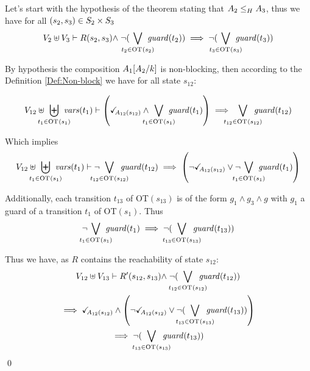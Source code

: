 \documentclass[runningheads]{llncs}
\begin{document}
\begin{enumerate}
Let's start  with the hypothesis of the theorem stating that $\wrel{A_2}{A_3}{H}$, thus we have for all  $\mpar{s_2, s_3} \in S_2 \times S_3$ 
\begin{multline*}
V_2 \uplus V_3  \vdash R\mpar{s_2, s_3} \nwedge \neg (\bigvee_\subbox{t_2 \in \fOT{s_2}} \fguard{t_2}) \implies   \neg(\bigvee_\subbox{t_3 \in \fOT{s_3}} \fguard{t_3})
\end{multline*}

By hypothesis  the composition  \(A_1\subst{A_2}{k}\) is non-blocking,  then according to the Definition \ref{Def:Non-block} we have for all state $s_{12}$: 


\begin{multline*}
V_{12} \uplus \biguplus_\subbox{t_1 \in \fOT{s_1}} \fvars{t_1}  \vdash  \left(\reach{A_{12}(s_{12})} \land \bigvee_\subbox{t_1 \in \fOT{s_1}} \fguard{t_1}\right) \implies \bigvee_\subbox{t_{12} \in \fOT{s_{12}}} \fguard{t_{12}}
\end{multline*}

Which implies 
\begin{multline*}
V_{12} \uplus \biguplus_\subbox{t_1 \in \fOT{s_1}} \fvars{t_1}  \vdash 
\neg{ \bigvee_\subbox{t_{12} \in \fOT{s_{12}}} \fguard{t_{12}}}
\implies 
\left(\neg{\reach{A_{12}(s_{12})} }\lor \neg{\bigvee_\subbox{t_1 \in \fOT{s_1}} \fguard{t_1}}
\right)
\end{multline*}

Additionally, each transition $t_{13}$ of OT$(s_{13})$ is of the form $
g_1\land g_3 \land g$ with $g_1$ a guard of a transition $t_{1}$ of OT$(s_{1})$.
Thus 
\[
\neg{\bigvee_\subbox{t_1 \in \fOT{s_1}} \fguard{t_1}}  \implies \neg (\bigvee_\subbox{t_{13} \in \fOT{s_{13}}} \fguard{t_{13}}) \]

Thus we have, as $R$ contains the reachability of state $s_{12}$:
\begin{multline*}
V_{12} \uplus V_{13}  \vdash  R'\mpar{s_{12}, s_{13}} \nwedge  \neg(\bigvee_\subbox{t_{12} \in \fOT{s_{12}}} \fguard{t_{12}}) \\
\implies \reach{A_{12}(s_{12})} \land \left(\neg{\reach{A_{12}(s_{12})} }\lor
\neg (\bigvee_\subbox{t_{13} \in \fOT{s_{13}}} \fguard{t_{13}})\right) \\
\implies
\neg (\bigvee_\subbox{t_{13} \in \fOT{s_{13}}} \fguard{t_{13}})
\end{multline*}
\qed

\end{enumerate}
\end{document}
